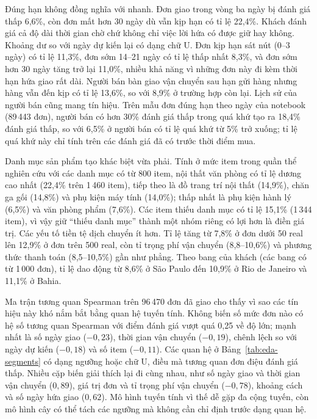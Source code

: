 \documentclass[12pt,a4paper]{report}
\begin{document}
Đúng hạn không đồng nghĩa với nhanh. Đơn giao trong vòng ba ngày bị đánh giá thấp 6,6\%, còn đơn mất hơn 30 ngày dù vẫn kịp hạn có tỉ lệ 22,4\%. Khách đánh giá cả độ dài thời gian chờ chứ không chỉ việc lời hứa có được giữ hay không. Khoảng dư so với ngày dự kiến lại có dạng chữ U. Đơn kịp hạn sát nút (0--3 ngày) có tỉ lệ 11,3\%, đơn sớm 14--21 ngày có tỉ lệ thấp nhất 8,3\%, và đơn sớm hơn 30 ngày tăng trở lại 11,0\%, nhiều khả năng vì những đơn này đi kèm thời hạn hứa giao rất dài. Người bán bàn giao vận chuyển sau hạn gửi hàng nhưng hàng vẫn đến kịp có tỉ lệ 13,6\%, so với 8,9\% ở trường hợp còn lại. Lịch sử của người bán cũng mang tín hiệu. Trên mẫu đơn đúng hạn theo ngày của notebook (89\,443 đơn), người bán có hơn 30\% đánh giá thấp trong quá khứ tạo ra 18,4\% đánh giá thấp, so với 6,5\% ở người bán có tỉ lệ quá khứ từ 5\% trở xuống; tỉ lệ quá khứ này chỉ tính trên các đánh giá đã có trước thời điểm mua.

Danh mục sản phẩm tạo khác biệt vừa phải. Tính ở mức item trong quần thể nghiên cứu với các danh mục có từ 800 item, nội thất văn phòng có tỉ lệ dương cao nhất (22,4\% trên 1\,460 item), tiếp theo là đồ trang trí nội thất (14,9\%), chăn ga gối (14,8\%) và phụ kiện máy tính (14,0\%); thấp nhất là phụ kiện hành lý (6,5\%) và văn phòng phẩm (7,6\%). Các item thiếu danh mục có tỉ lệ 15,1\% (1\,344 item), vì vậy giữ ``thiếu danh mục'' thành một nhóm riêng có lợi hơn là điền giá trị. Các yếu tố tiền tệ dịch chuyển ít hơn. Tỉ lệ tăng từ 7,8\% ở đơn dưới 50 real lên 12,9\% ở đơn trên 500 real, còn tỉ trọng phí vận chuyển (8,8--10,6\%) và phương thức thanh toán (8,5--10,5\%) gần như phẳng. Theo bang của khách (các bang có từ 1\,000 đơn), tỉ lệ dao động từ 8,6\% ở São Paulo đến 10,9\% ở Rio de Janeiro và 11,1\% ở Bahia.

Ma trận tương quan Spearman trên 96\,470 đơn đã giao cho thấy vì sao các tín hiệu này khó nắm bắt bằng quan hệ tuyến tính. Không biến số mức đơn nào có hệ số tương quan Spearman với điểm đánh giá vượt quá 0,25 về độ lớn; mạnh nhất là số ngày giao ($-0{,}23$), thời gian vận chuyển ($-0{,}19$), chênh lệch so với ngày dự kiến ($-0{,}18$) và số item ($-0{,}11$). Các quan hệ ở Bảng~\ref{tab:eda-segments} có dạng ngưỡng hoặc chữ U, điều mà tương quan đơn điệu đánh giá thấp. Nhiều cặp biến giải thích lại đi cùng nhau, như số ngày giao và thời gian vận chuyển ($0{,}89$), giá trị đơn và tỉ trọng phí vận chuyển ($-0{,}78$), khoảng cách và số ngày hứa giao ($0{,}62$). Mô hình tuyến tính vì thế dễ gặp đa cộng tuyến, còn mô hình cây có thể tách các ngưỡng mà không cần chỉ định trước dạng quan hệ.
\end{document}
